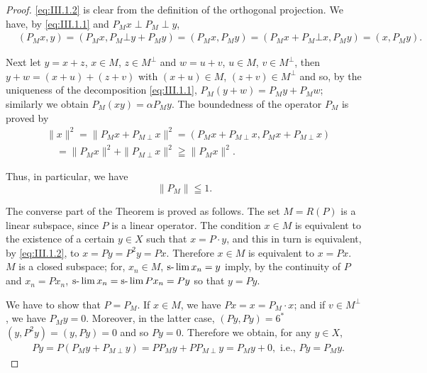 \begin{proof}
 \eqref{eq:III.1.2} is clear from the definition of the orthogonal projection. We have, by \eqref{eq:III.1.1} and $P_M x \perp P_M \perp y$, 
\[ \begin{aligned}
&(P _{M} x, y)  = (P _{M} x, P _{M} \bot y + P _{M} y) = (P _{M} x, P _{M} y) = (P _{M} x + P _{M} \bot x, P _{M} y) = (x, P _{M} y).
\end{aligned}
\]

Next let $y = x + z$, $x \in M$, $z \in M^{\perp}$ and $w = u + v$, $u \in M$, $v \in M^{\perp}$, then $y + w = (x + u) + (z + v)$ with $(x + u) \in M$, $(z + v) \in M^{\perp}$ and so, by the uniqueness of the decomposition \eqref{eq:III.1.1}, $P_M(y + w) = P_My + P_Mw$; similarly we obtain $P_M(xy) = \alpha P_My$. The boundedness of the operator $P_M$ is proved by 
\[
\begin{aligned} & {\| x \| ^{2} = \| P _{M} x + P _{M \perp} x \| ^{2} = (P _{M} x + P _{M \perp} x, P _{M} x + P _{M \perp} x)} \\ & {\quad = \| P _{M} x \| ^{2} + \| P _{M \perp} x \| ^{2} \geqq \| P _{M} x \| ^{2}.} \end{aligned}
\]

Thus, in particular, we have 
\begin{equation}\label{eq:III.1.4}
\left\| P _{M} \right\| \leqq 1.
\end{equation}

The converse part of the Theorem is proved as follows. The set $M = R(P)$ is a linear subspace, since $P$ is a linear operator. The condition $x \in M$ is equivalent to the existence of a certain $y \in X$ such that $x = P \cdot y$, and this in turn is equivalent, by \eqref{eq:III.1.2}, to $x = Py = P^2y = Px$. Therefore $x \in M$ is equivalent to $x = Px$. $M$ is a closed subspace; for, $x_n \in M$, $\text{s-}\lim x_n = y$ imply, by the continuity of $P$ and $x_n = Px_n$, $\text{s-}\lim x_n = \text{s-}\lim Px_n = Py$ so that $y = Py$. 

We have to show that $P = P_{M}$. If $x \in M$, we have $Px = x = P_{M} \cdot x$; and if $v \in M^{\perp}$, we have $P_{M}y = 0$. Moreover, in the latter case, $(Py, Py) = 6^{*}$ 
$(y, P^2 y) = (y, Py) = 0$ and so $Py = 0$. Therefore we obtain, for any $y \in X$, 
\[
\begin{aligned}
&P y  = P (P _{M} y + P _{M \perp} y) = P P _{M} y + P P _{M \perp} y = P _{M} y + 0, \text{ i.e., } P y = P _{M} y.
\end{aligned}
\]
\end{proof}

